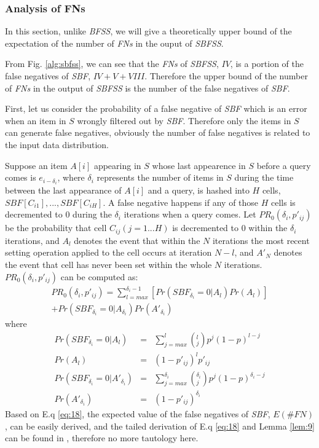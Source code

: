 \documentclass[conference]{IEEEtran}
\begin{document}
\subsubsection{\textbf{Analysis of FNs}}
In this section, unlike \emph{BFSS}, we will give a theoretically upper bound of the expectation of the number of \emph{FNs} in the ouput of \emph{SBFSS}. \par
From Fig. \ref{alg:sbfss}, we can see that the \emph{FNs} of \emph{SBFSS}, $IV$, is a portion of the false negatives of \emph{SBF}, $IV+V+VIII$. Therefore the upper bound of the number of \emph{FNs} in the output of \emph{SBFSS} is the number of the false negatives of \emph{SBF}.\par
First, let us consider the probability of a false negative of \emph{SBF} which is an error when an item in $S$ wrongly filtered out by \emph{SBF}. Therefore only the items in $S$ can generate false negatives, obviously the number of false negatives is related to the input data distribution.\par
Suppose an item $A[i]$ appearing in $S$ whose last appearence in $S$ before a query comes is $e_{i-\delta_i}$, where $\delta_i$ represents the number of items in $S$ during the time between the last appearance of $A[i]$ and a query, is hashed into $H$ cells, $SBF[C_{i1}],...,SBF[C_{iH}]$. A false negative happens if any of those $H$ cells is decremented to 0 during the $\delta_i$ iterations when a query comes. Let $PR_0(\delta_i,p'_{ij})$ be the probability that cell $C_{ij} (j = 1...H)$ is decremented to 0 within the $\delta_i$ iterations, and $A_l$ denotes the event that within the $N$ iterations the most recent setting operation applied to the cell occurs at iteration $N-l$, and $A'_N$ denotes the event that cell has never been set within the whole $N$ iterations. $PR_0(\delta_i,p'_{ij})$ can be computed as:
\begin{equation}\label{eq:18}
\begin{split}
PR_0(\delta_i,p'_{ij})=\sum_{l=max}^{\delta_i-1}[Pr(SBF_{\delta_i}=0|A_l)Pr(A_l)]\\
+Pr(SBF_{\delta_i}=0|A_{\delta_i})Pr(A'_{\delta_i})
\end{split}
\end{equation}
where 
\setlength{\arraycolsep}{0.0em}
\begin{eqnarray}\label{eq:19}
Pr(SBF_{\delta_i}=0|A_l)&=&\sum_{j=max}^{l}\left(^l_j\right)p^j(1-p)^{l-j}\\
Pr(A_l)&=&(1-p'_{ij})^lp'_{ij}\\
Pr(SBF_{\delta_i}=0|A'_{\delta_i})&=&\sum_{j=max}^{\delta_i}\left(^{\delta_i}_j\right)p^j(1-p)^{\delta_i-j}\\
Pr(A'_{\delta_i})&=&(1-p'_{ij})^{\delta_i}
\end{eqnarray}
\setlength{\arraycolsep}{5pt}
Based on E.q \ref{eq:18}, the expected value of the false negatives of \emph{SBF}, $E(\#FN)$, can be easily derived, and the tailed derivation of E.q \ref{eq:18} and Lemma \ref{lem:9} can be found in \cite{IEEEexample:sbf}, therefore no more tautology here.\par
\end{document}
